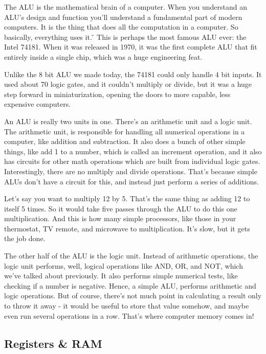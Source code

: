 The ALU is the mathematical brain of a computer. When you understand an ALU's design and function you'll understand a
fundamental part of modern computers. It is the thing that does all the computation in a computer. So basically,
everything uses it. \v

\be
This is perhaps the most famous ALU ever: the Intel 74181. When it was released in 1970, it was the first complete
ALU that fit entirely inside a single chip, which was a huge engineering feat.


Unlike the 8 bit ALU we made today, the 74181 could only handle 4 bit inputs. It used about 70 logic gates, and it
couldn't multiply or divide, but it was a huge step forward in miniaturization, opening the doors to more capable,
less expensive computers.
\ee

An ALU is really two units in one. There's an arithmetic unit and a logic unit. The arithmetic unit, is responsible
for handling all numerical operations in a computer, like addition and subtraction. It also does a bunch of other
simple things, like add 1 to a number, which is called an increment operation, and it also has circuits for other
math operations which are built from individual logic gates. Interestingly, there are no multiply and divide
operations. That's because simple ALUs don't have a circuit for this, and instead just perform a series of additions.

\be
Let's say you want to multiply 12 by 5. That's the same thing as adding 12 to itself 5 times. So it would take five
passes through the ALU to do this one multiplication. And this is how many simple processors, like those in your
thermostat, TV remote, and microwave to multiplication. It's slow, but it gets the job done.
\ee

The other half of the ALU is the logic unit. Instead of arithmetic operations, the logic unit performs, well, logical
operations like AND, OR, and NOT, which we've talked about previously. It also performs simple numerical tests, like
checking if a number is negative. Hence, a simple ALU, performs arithmetic and logic operations. But of course,
there's not much point in calculating a result only to throw it away - it would be useful to store that value
somehow, and maybe even run several operations in a row. That's where computer memory comes in!

\subsection{Registers \& RAM}

